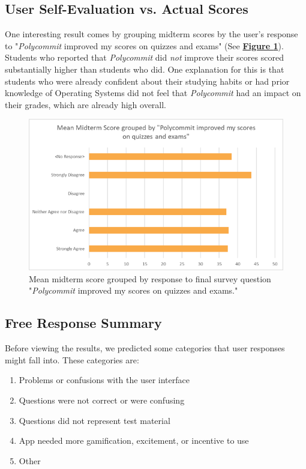 \subsection{User Self-Evaluation vs. Actual Scores}

\par One interesting result comes by grouping midterm scores by the user's response to "\textit{Polycommit} improved my scores on quizzes and exams" (See \textbf{\hyperref[fig:overconfidence]{Figure \ref*{fig:overconfidence}}}). Students who reported that \textit{Polycommit} did \textit{not} improve their scores scored substantially higher than students who did. One explanation for this is that students who were already confident about their studying habits or had prior knowledge of Operating Systems did not feel that \textit{Polycommit} had an impact on their grades, which are already high overall.

\begin{figure}[h]
	\includegraphics[width=1.0\linewidth]{figures/improved-vs-score}
	\caption{Mean midterm score grouped by response to final survey question "\textit{Polycommit} improved my scores on quizzes and exams."}
	\label{fig:overconfidence}
\end{figure}


\subsection{Free Response Summary}
\par Before viewing the results, we predicted some categories that user responses might fall into. These categories are:

\begin{enumerate}
	\item Problems or confusions with the user interface
	\item Questions were not correct or were confusing
	\item Questions did not represent test material
	\item App needed more gamification, excitement, or incentive to use
	\item Other
\end{enumerate}

